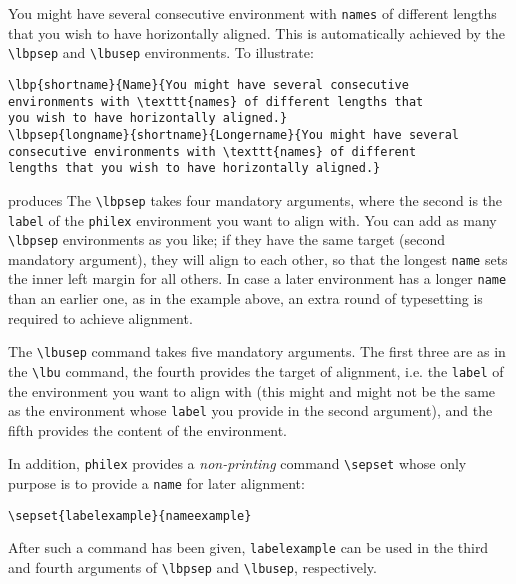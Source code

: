 \documentclass[11pt]{article}
\newcommand{\emp}{\emph}
\begin{document}
You might have  several consecutive environment with \verb+names+ of different lengths that you wish to have horizontally aligned. This is automatically achieved by the \verb+\lbpsep+ and \verb+\lbusep+ environments. To illustrate:

\begin{verbatim}
\lbp{shortname}{Name}{You might have several consecutive 
environments with \texttt{names} of different lengths that 
you wish to have horizontally aligned.}
\lbpsep{longname}{shortname}{Longername}{You might have several 
consecutive environments with \texttt{names} of different 
lengths that you wish to have horizontally aligned.}
\end{verbatim}%
%
produces%
% 
\newpage
{}
% 
% 
The \verb+\lbpsep+ takes four mandatory arguments, where the second is the \verb+label+ of the \verb+philex+ environment you want to align with. You can add as many \verb+\lbpsep+ environments as you like; if they have the same target (second mandatory argument), they will align to each other, so that the longest \verb+name+ sets the inner left margin for all others. In case a later environment has a longer \verb+name+ than an earlier one, as in the example above, an extra round of typesetting is required to achieve alignment. 

The \verb+\lbusep+ command takes five mandatory arguments. The first three are as in the \verb+\lbu+ command, the fourth provides the target of alignment, i.e. the \verb+label+ of the environment you want to align with (this might and might not be the same as the environment whose \verb+label+ you provide in the second argument), and the fifth provides the content of the environment.

In addition,  \verb+philex+ provides a \emp{non-printing} command \verb+\sepset+ whose only purpose is to provide a \verb+name+ for later alignment:

\begin{verbatim}
\sepset{labelexample}{nameexample}
\end{verbatim}%
% 
After such a  command has been given, \verb+labelexample+ can be used in the third and fourth arguments of \verb+\lbpsep+ and \verb+\lbusep+, respectively. 
\end{document}
